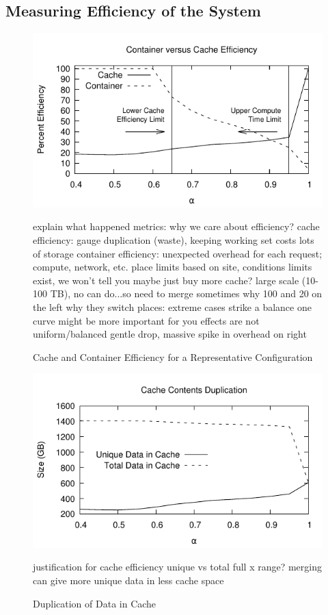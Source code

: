 \documentclass[sigconf]{acmart}
\begin{document}
    
\subsection{Measuring Efficiency of the System}

\begin{figure}
\includegraphics[width=\linewidth]{curated/comparative/distribution_efficiency.pdf}
\caption{Cache and Container Efficiency for a Representative Configuration}
\label{fig:dist-eff}
explain what happened
metrics: why we care about efficiency?
cache efficiency: gauge duplication (waste), keeping working set costs lots of storage
container efficiency: unexpected overhead for each request; compute, network, etc.
place limits based on site, conditions
limits exist, we won't tell you
maybe just buy more cache?
large scale (10-100 TB), no can do...so need to merge sometimes
why 100 and 20 on the left
why they switch places: extreme cases
strike a balance
one curve might be more important for you
effects are not uniform/balanced gentle drop, massive spike in overhead on right
\fi
\end{figure}


\begin{figure}
\includegraphics[width=\linewidth]{curated/comparative/cache_efficiency.pdf}
\caption{Duplication of Data in Cache}
\label{fig:cache-eff}
justification for cache efficiency
unique vs total
full x range?
merging can give more unique data in less cache space
\fi
\end{figure}
\end{document}
